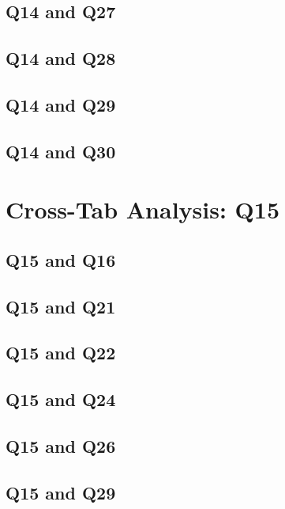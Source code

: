 \documentclass{report}
\begin{document}
\clearpage
\section{Q14 and Q27}


\clearpage
\section{Q14 and Q28}


\clearpage
\section{Q14 and Q29}


\clearpage
\section{Q14 and Q30}


\chapter{Cross-Tab Analysis: Q15}
\section{Q15 and Q16}


\clearpage
\section{Q15 and Q21}


\clearpage
\section{Q15 and Q22}


\clearpage
\section{Q15 and Q24}


\clearpage
\section{Q15 and Q26}


\clearpage
\section{Q15 and Q29}

\end{document}
